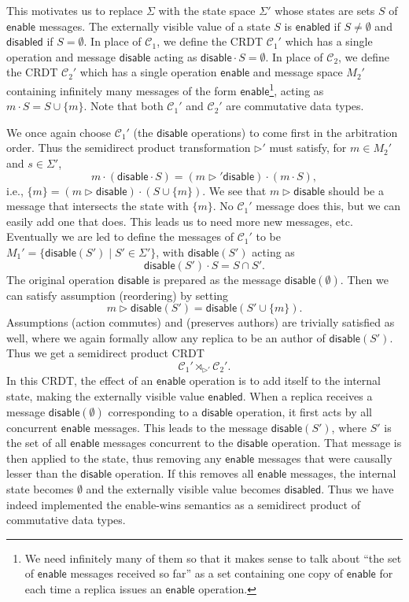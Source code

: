 \documentclass[acmsmall,nonacm,12pt]{acmart}
\newcommand{\mc}[1]{\ensuremath{\mathcal{#1}}}
\newcommand{\msf}[1]{\ensuremath{\mathsf{#1}}}
\newcommand{\act}{\triangleright}
\theoremstyle{plain}
\theoremstyle{definition}
\begin{document}
This motivates us to replace $\Sigma$ with the state space $\Sigma'$ whose states are sets $S$ of $\msf{enable}$ messages.  The externally visible value of a state $S$ is $\msf{enabled}$ if $S \neq \emptyset$ and $\msf{disabled}$ if $S = \emptyset$.  In place of $\mc{C}_1$, we define the CRDT $\mc{C}_1'$ which has a single operation and message $\msf{disable}$ acting as $\msf{disable} \cdot S = \emptyset$.  In place of $\mc{C}_2$, we define the CRDT $\mc{C}_2'$ which has a single operation $\msf{enable}$ and message space $M_2'$ containing infinitely many messages of the form $\msf{enable}$\footnote{We need infinitely many of them so that it makes sense to talk about ``the set of $\msf{enable}$ messages received so far'' as a set containing one copy of $\msf{enable}$ for each time a replica issues an $\msf{enable}$ operation.}, acting as $m \cdot S = S \cup \{m\}$.  Note that both $\mc{C}_1'$ and $\mc{C}_2'$ are commutative data types.

We once again choose $\mc{C}_1'$ (the $\msf{disable}$ operations) to come first in the arbitration order.  Thus the semidirect product transformation $\act'$ must satisfy, for $m \in M_2'$ and $s \in \Sigma'$,
\[
m \cdot (\msf{disable} \cdot S) = (m \act' \msf{disable}) \cdot (m \cdot S),
\]
i.e., $\{m\} = (m \act \msf{disable}) \cdot (S \cup \{m\})$.  We see that $m \act \msf{disable}$ should be a message that intersects the state with $\{m\}$.  No $\mc{C}_1'$ message does this, but we can easily add one that does.  This leads us to need more new messages, etc.  Eventually we are led to define the messages of $\mc{C}_1'$ to be $M_1' = \{\msf{disable}(S') \mid S' \in \Sigma'\}$, with $\msf{disable}(S')$ acting as
\[
\msf{disable}(S') \cdot S = S \cap S'.
\]
The original operation $\msf{disable}$ is prepared as the message $\msf{disable}(\emptyset)$.  Then we can satisfy assumption (reordering) by setting
\[
m \act \msf{disable}(S') = \msf{disable}(S' \cup \{m\}).
\]
Assumptions (action commutes) and (preserves authors) are trivially satisfied as well, where we again formally allow any replica to be an author of $\msf{disable}(S')$.  Thus we get a semidirect product CRDT
\[
\mc{C}_1' \rtimes_{\act'} \mc{C}_2'.
\]
In this CRDT, the effect of an $\msf{enable}$ operation is to add itself to the internal state, making the externally visible value $\msf{enabled}$.  When a replica receives a message $\msf{disable}(\emptyset)$ corresponding to a $\msf{disable}$ operation, it first acts by all concurrent $\msf{enable}$ messages.  This leads to the message $\msf{disable}(S')$, where $S'$ is the set of all $\msf{enable}$ messages concurrent to the $\msf{disable}$ operation.  That message is then applied to the state, thus removing any $\msf{enable}$ messages that were causally lesser than the $\msf{disable}$ operation.  If this removes all $\msf{enable}$ messages, the internal state becomes $\emptyset$ and the externally visible value becomes $\msf{disabled}$.  Thus we have indeed implemented the enable-wins semantics as a semidirect product of commutative data types.
\end{document}
